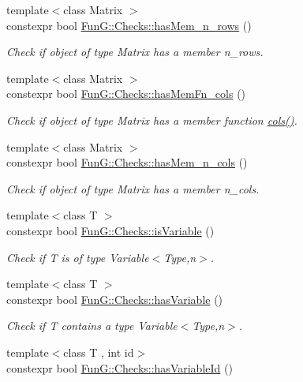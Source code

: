 \begin{DoxyCompactItemize}
{\footnotesize template$<$class Matrix $>$ }\\constexpr bool \hyperlink{group__Checks_ga6f66adbc63ed46140f1080e9914cb5de}{Fun\+G\+::\+Checks\+::has\+Mem\+\_\+n\+\_\+rows} ()
\begin{DoxyCompactList}\small\item\em Check if object of type Matrix has a member n\+\_\+rows. \end{DoxyCompactList}\item 
{\footnotesize template$<$class Matrix $>$ }\\constexpr bool \hyperlink{group__Checks_ga4979df2d7b7abebb0253a569e41274b1}{Fun\+G\+::\+Checks\+::has\+Mem\+Fn\+\_\+cols} ()
\begin{DoxyCompactList}\small\item\em Check if object of type Matrix has a member function \hyperlink{namespaceFunG_1_1LinearAlgebra_ae981b8bee32eea3ce87f41874835c9c1}{cols()}. \end{DoxyCompactList}\item 
{\footnotesize template$<$class Matrix $>$ }\\constexpr bool \hyperlink{group__Checks_ga0a87aaa714499abcaabd921297be61e4}{Fun\+G\+::\+Checks\+::has\+Mem\+\_\+n\+\_\+cols} ()
\begin{DoxyCompactList}\small\item\em Check if object of type Matrix has a member n\+\_\+cols. \end{DoxyCompactList}\item 
{\footnotesize template$<$class T $>$ }\\constexpr bool \hyperlink{group__Checks_gac2a1a8aedf54c42cb6d47b3b64bbc761}{Fun\+G\+::\+Checks\+::is\+Variable} ()
\begin{DoxyCompactList}\small\item\em Check if T is of type Variable$<$\+Type,n$>$. \end{DoxyCompactList}\item 
{\footnotesize template$<$class T $>$ }\\constexpr bool \hyperlink{group__Checks_ga6d289274975a662346a1b5adf0d31f37}{Fun\+G\+::\+Checks\+::has\+Variable} ()
\begin{DoxyCompactList}\small\item\em Check if T contains a type Variable$<$\+Type,n$>$. \end{DoxyCompactList}\item 
{\footnotesize template$<$class T , int id$>$ }\\constexpr bool \hyperlink{group__Checks_ga0d42132679e0563893cc6c1809dc9a55}{Fun\+G\+::\+Checks\+::has\+Variable\+Id} ()

\end{DoxyCompactItemize}
